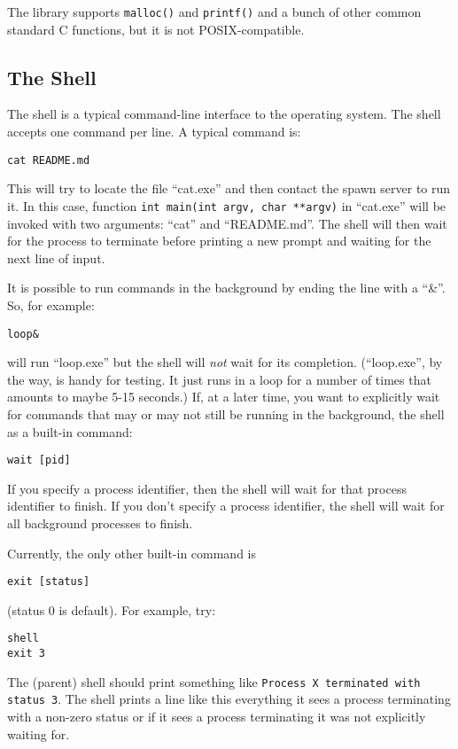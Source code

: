 \documentclass{article}
\begin{document}
The library supports \texttt{malloc()} and \texttt{printf()} and a
bunch of other common standard C functions, but it is not POSIX-compatible.

\subsection{The Shell}

The shell is a typical command-line interface to the operating system.
The shell accepts one command per line.  A typical command is:
\begin{verbatim}
cat README.md
\end{verbatim}

This will try to locate the file ``cat.exe'' and then contact the
spawn server to run it.  In this case,
function \texttt{int main(int argv, char **argv)}
in ``cat.exe'' will be invoked with two arguments: ``cat'' and ``README.md''.
The shell will then wait for the process to terminate before printing a
new prompt and waiting for the next line of input.

It is possible to run commands in the background by ending the line with
a ``\&''.  So, for example:
\begin{verbatim}
loop&
\end{verbatim}
will run ``loop.exe'' but the shell will \emph{not} wait for its
completion.
(``loop.exe'', by the way, is handy for testing.  It just runs in a loop
for a number of times that amounts to maybe 5-15 seconds.)
If, at a later time, you want to explicitly wait for
commands that may or may not still be running in the background,
the shell as a built-in command:
\begin{verbatim}
wait [pid]
\end{verbatim}
If you specify a process identifier, then the shell will wait for
that process identifier to finish.  If you don't specify a process
identifier, the shell will wait for all background processes to finish.

Currently, the only other built-in command is
\begin{verbatim}
exit [status]
\end{verbatim}
(status 0 is default).
For example, try:
\begin{verbatim}
shell
exit 3
\end{verbatim}
The (parent) shell should print something like
\texttt{Process X terminated with status 3}.
The shell prints a line like this everything it sees a process terminating
with a non-zero status or if it sees a process terminating it was not
explicitly waiting for.
\end{document}
